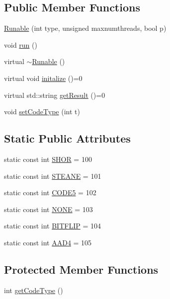\subsection*{Public Member Functions}
\begin{DoxyCompactItemize}
\item 
\hyperlink{class_runable_a3e264e6a6e374f7111d5c4fea0a6ca3c}{Runable} (int type, unsigned maxnumthreads, bool p)
\item 
void \hyperlink{class_runable_a766cbda482eeb5c181941f1a1113041c}{run} ()
\item 
virtual \hyperlink{class_runable_a6b1e67cab0fb137e26963f6e8d2687d4}{$\sim$\+Runable} ()
\item 
virtual void \hyperlink{class_runable_ae45ce89bb273ba5863e8ca0951caef85}{initalize} ()=0
\item 
virtual std\+::string \hyperlink{class_runable_a761a0c657253223f3dd7cf2c0762c34e}{get\+Result} ()=0
\item 
void \hyperlink{class_runable_a41f4c8d84fa427f05b82bb530d19e454}{set\+Code\+Type} (int t)
\end{DoxyCompactItemize}
\subsection*{Static Public Attributes}
\begin{DoxyCompactItemize}
\item 
static const int \hyperlink{class_runable_a27f57a3218c5237bdd5c0134db82e3f9}{S\+H\+OR} = 100
\item 
static const int \hyperlink{class_runable_a68af748dc3edebef5e1dd7a3e18a1b5f}{S\+T\+E\+A\+NE} = 101
\item 
static const int \hyperlink{class_runable_ad3dbc64c086f9e02f45c8e877f5ae898}{C\+O\+D\+E5} = 102
\item 
static const int \hyperlink{class_runable_a9dfae104f3c3623e9e39908c1560a7fe}{N\+O\+NE} = 103
\item 
static const int \hyperlink{class_runable_a56fc454699fbd4fcbe05bb90c36b80b0}{B\+I\+T\+F\+L\+IP} = 104
\item 
static const int \hyperlink{class_runable_a89b302b9a67e49ca32abd77560b58bdb}{A\+A\+D4} = 105
\end{DoxyCompactItemize}
\subsection*{Protected Member Functions}
\begin{DoxyCompactItemize}
\item 
int \hyperlink{class_runable_a9e9e55d77ae3cf5486fc60bae62f1141}{get\+Code\+Type} ()
\end{DoxyCompactItemize}
